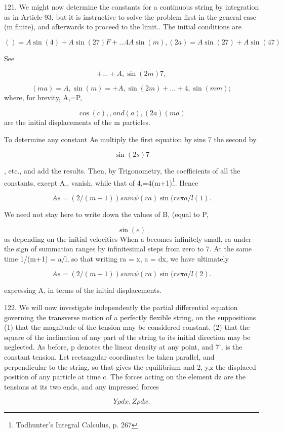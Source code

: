 121. We might now determine the constants for a continuous string by
integration as in Article 93, but it is instructive to solve the problem first
in the general case (m finite), and afterwards to proceed to the limit.. The
initial conditions are

\[( )=A \sin(4)+ A \sin(27) F +...4 A \sin(m), (2a) =A \sin(27) + A \sin(47)\]

See

\[+... +A, \sin(2m) 7,\]

\[(ma) =A, \sin(m)= + A, \sin(2m)  +... +4, \sin(mm);\]
where, for brevity,
A,=P,

\[\cos(c),, and (a), (2a) (ma)\]
are the initial displacements of the m
particles.

To determine any constant Ae multiply the first equation by sins 7 the second
by

\[\sin(2s) 7\]

, etc., and add the results. Then, by Trigonometry, the coefficients of all the
constants, except A,, vanish, while that of 4,=4(m+1)\footnote{Todhunter's
Integral Calculus, p. 267}. Hence

\[As=(2/(m+1)) sum \psi (ra) \sin(rs  \pi a /l (1).\]

We need not stay here to write down the values of B, (equal to P,

\[\sin(e)\]
as depending on the initial velocities When a becomes infinitely
small, ra under the sign of summation ranges by infinitesimal steps from zero
to 7. At the same time 1/(m+1) = a/l, so that writing ra = x, a = dx, we have
ultimately

\[As=(2/(m+1)) sum \psi (ra) \sin(rs  \pi a /l (2).\]

expressing A, in terms of the initial displacements.

122. We will now investigate independently the partial differential equation
governing the transverse motion of a perfectly flexible string, on the
suppositions (1) that the magnitude of the tension may be considered constant,
(2) that the square of the inclination of any part of the string to its initial
direction may be neglected. As before, p denotes the linear density at any
point, and 7', is the constant tension. Let rectangular coordinates be taken
parallel, and perpendicular to the string, so that gives the equilibrium and 2,
y,z the displaced position of any particle at time c. The forces acting on the
element dz are the tensions at its two ends, and any impressed forces

\[Y \rho dx, Z \rho dx.\]

